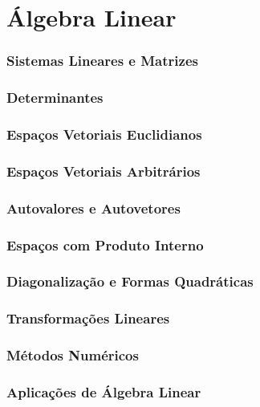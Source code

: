 \part{Álgebra Linear}
\section{Sistemas Lineares e Matrizes}
\section{Determinantes}
\section{Espaços Vetoriais Euclidianos}
\section{Espaços Vetoriais Arbitrários}
\section{Autovalores e Autovetores}
\section{Espaços com Produto Interno}
\section{Diagonalização e Formas Quadráticas}
\section{Transformações Lineares}
\section{Métodos Numéricos}
\section{Aplicações de Álgebra Linear}
